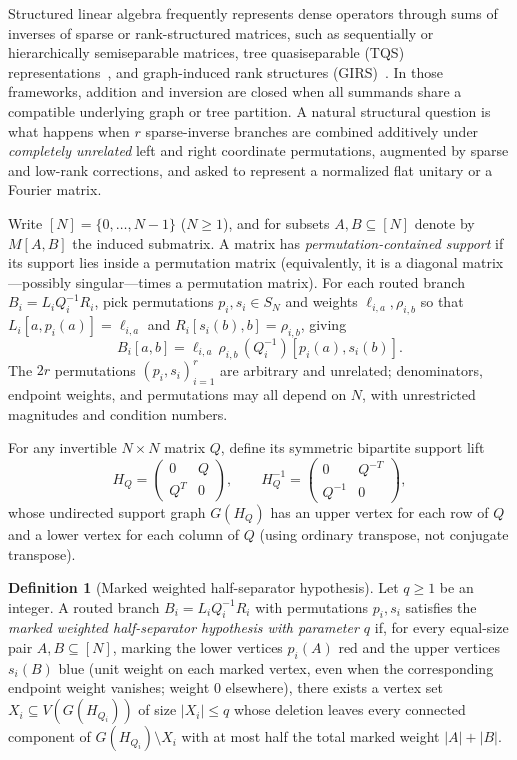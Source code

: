 \documentclass[11pt,reqno]{amsart}
\numberwithin{equation}{section}
\theoremstyle{definition}
\newtheorem{definition}[theorem]{Definition}
\theoremstyle{remark}
\begin{document}
Structured linear algebra frequently represents dense operators through sums of inverses of sparse or rank-structured matrices, such as sequentially or hierarchically semiseparable matrices, tree quasiseparable (TQS) representations~\cite{GCD25}, and graph-induced rank structures (GIRS)~\cite{CEG19}. In those frameworks, addition and inversion are closed when all summands share a compatible underlying graph or tree partition. A natural structural question is what happens when $r$ sparse-inverse branches are combined additively under \emph{completely unrelated} left and right coordinate permutations, augmented by sparse and low-rank corrections, and asked to represent a normalized flat unitary or a Fourier matrix.

Write $[N] = \{0,\ldots,N-1\}$ ($N\ge 1$), and for subsets $A,B\subseteq[N]$ denote by $M[A,B]$ the induced submatrix. A matrix has \emph{permutation-contained support} if its support lies inside a permutation matrix (equivalently, it is a diagonal matrix---possibly singular---times a permutation matrix). For each routed branch $B_i = L_i Q_i^{-1} R_i$, pick permutations $p_i,s_i\in S_N$ and weights $\ell_{i,a},\rho_{i,b}$ so that $L_i[a,p_i(a)]=\ell_{i,a}$ and $R_i[s_i(b),b]=\rho_{i,b}$, giving
\begin{equation}
\label{eq:routed-entry}
B_i[a,b] = \ell_{i,a}\,\rho_{i,b}\,(Q_i^{-1})[p_i(a),s_i(b)].
\end{equation}
The $2r$ permutations $(p_i,s_i)_{i=1}^r$ are arbitrary and unrelated; denominators, endpoint weights, and permutations may all depend on $N$, with unrestricted magnitudes and condition numbers.

For any invertible $N\times N$ matrix $Q$, define its symmetric bipartite support lift
\begin{equation}
\label{eq:bipartite-lift}
H_Q = \begin{pmatrix} 0 & Q \\ Q^T & 0 \end{pmatrix},\qquad
H_Q^{-1} = \begin{pmatrix} 0 & Q^{-T} \\ Q^{-1} & 0 \end{pmatrix},
\end{equation}
whose undirected support graph $G(H_Q)$ has an upper vertex for each row of $Q$ and a lower vertex for each column of $Q$ (using ordinary transpose, not conjugate transpose).

\begin{definition}[Marked weighted half-separator hypothesis]
\label{def:marked-sep}
Let $q\ge 1$ be an integer. A routed branch $B_i = L_i Q_i^{-1} R_i$ with permutations $p_i,s_i$ satisfies the \emph{marked weighted half-separator hypothesis with parameter $q$} if, for every equal-size pair $A,B\subseteq[N]$, marking the lower vertices $p_i(A)$ red and the upper vertices $s_i(B)$ blue (unit weight on each marked vertex, even when the corresponding endpoint weight vanishes; weight $0$ elsewhere), there exists a vertex set $X_i\subseteq V(G(H_{Q_i}))$ of size $|X_i|\le q$ whose deletion leaves every connected component of $G(H_{Q_i})\setminus X_i$ with at most half the total marked weight $|A|+|B|$.
\end{definition}
\end{document}
